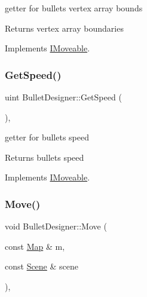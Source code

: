 getter for bullet\textquotesingle{}s vertex array bounds 

\begin{DoxyReturn}{Returns}
vertex array boundaries 
\end{DoxyReturn}


Implements \mbox{\hyperlink{class_i_moveable}{I\+Moveable}}.

\mbox{\label{class_bullet_designer_ab780d9e61cd46d6e2d1f73ad5144cb42}} 
\subsubsection{\texorpdfstring{Get\+Speed()}{GetSpeed()}}
{\footnotesize\ttfamily uint Bullet\+Designer\+::\+Get\+Speed (\begin{DoxyParamCaption}{ }\end{DoxyParamCaption})\hspace{0.3cm}{\ttfamily [override]}, {\ttfamily [virtual]}}



getter for bullet\textquotesingle{}s speed 

\begin{DoxyReturn}{Returns}
bullet\textquotesingle{}s speed 
\end{DoxyReturn}


Implements \mbox{\hyperlink{class_i_moveable}{I\+Moveable}}.

\mbox{\label{class_bullet_designer_a94ddb07bc126b159abc4cfedf27e18b7}} 
\subsubsection{\texorpdfstring{Move()}{Move()}}
{\footnotesize\ttfamily void Bullet\+Designer\+::\+Move (\begin{DoxyParamCaption}\item[{const \mbox{\hyperlink{class_map}{Map}} \&}]{m,  }\item[{const \mbox{\hyperlink{class_scene}{Scene}} \&}]{scene }\end{DoxyParamCaption})\hspace{0.3cm}{\ttfamily [override]}, {\ttfamily [virtual]}}



